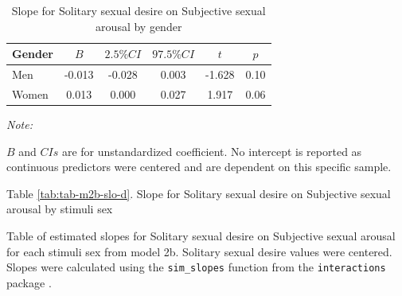 \documentclass[
  bookmarksnumbered]{article}
\begin{document}
\begin{table}[H]

\caption{\label{tab:tab-m2b-slo-c}Slope for Solitary sexual desire on Subjective sexual arousal by gender}
\centering
\begin{threeparttable}
\begin{tabular}[t]{lccccc}
\toprule
Gender & $B$ & $2.5\% CI$ & $97.5\% CI$ & $t$ & $p$\\
\midrule
Men & -0.013 & -0.028 & 0.003 & -1.628 & 0.10\\
Women & 0.013 & 0.000 & 0.027 & 1.917 & 0.06\\
\bottomrule
\end{tabular}
\begin{tablenotes}[para]
\item \textit{Note: } 
\item $B$ and $CIs$ are for unstandardized coefficient.
           No intercept is reported as continuous predictors were centered
           and are dependent on this specific sample.
\end{tablenotes}
\end{threeparttable}
\end{table}

Table \ref{tab:tab-m2b-slo-d}. Slope for Solitary sexual desire on Subjective sexual arousal by stimuli sex

Table of estimated slopes for Solitary sexual desire on Subjective sexual arousal for each stimuli sex from model 2b. Solitary sexual desire values were centered. Slopes were calculated using the \texttt{sim\_slopes} function from the \texttt{interactions} package \autocite{interactionscit}.
\end{document}
